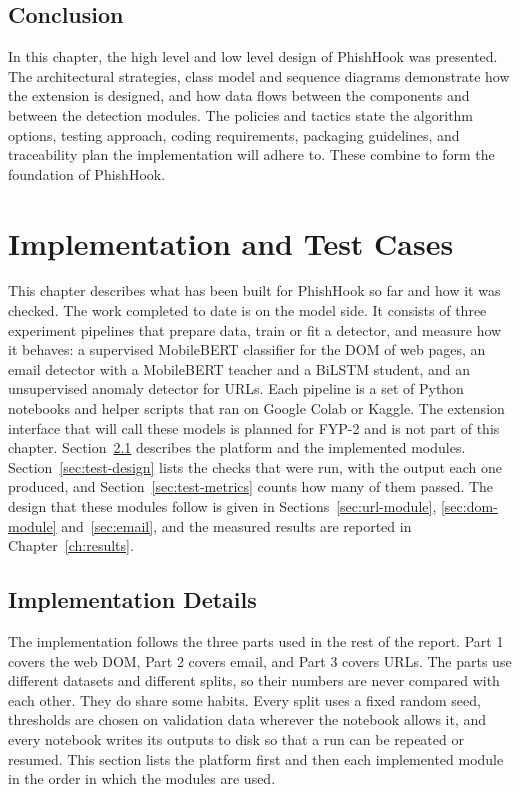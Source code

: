 \documentclass{FastFyp}
\begin{document}
\section{Conclusion}
\label{sec:design-conclusion}
In this chapter, the high level and low level design of PhishHook was presented. The architectural strategies, class model and sequence diagrams demonstrate how the extension is designed, and how data flows between the components and between the detection modules. The policies and tactics state the algorithm options, testing approach, coding requirements, packaging guidelines, and traceability plan the implementation will adhere to. These combine to form the foundation of PhishHook.










\chapter{Implementation and Test Cases}
\label{ch:implementation}
This chapter describes what has been built for PhishHook so far and how it was checked. The work completed to date is on the model side. It consists of three experiment pipelines that prepare data, train or fit a detector, and measure how it behaves: a supervised MobileBERT classifier for the DOM of web pages, an email detector with a MobileBERT teacher and a BiLSTM student, and an unsupervised anomaly detector for URLs. Each pipeline is a set of Python notebooks and helper scripts that ran on Google Colab or Kaggle. The extension interface that will call these models is planned for FYP-2 and is not part of this chapter. 
Section~\ref{sec:impl-details} describes the platform and the implemented modules. Section~\ref{sec:test-design} lists the checks that were run, with the output each one produced, and Section~\ref{sec:test-metrics} counts how many of them passed. The design that these modules follow is given in Sections~\ref{sec:url-module}, \ref{sec:dom-module} and~\ref{sec:email}, and the measured results are reported in Chapter~\ref{ch:results}. 

\section{Implementation Details}
\label{sec:impl-details}
The implementation follows the three parts used in the rest of the report. Part 1 covers the web DOM, Part 2 covers email, and Part 3 covers URLs. The parts use different datasets and different splits, so their numbers are never compared with each other. They do share some habits. Every split uses a fixed random seed, thresholds are chosen on validation data wherever the notebook allows it, and every notebook writes its outputs to disk so that a run can be repeated or resumed. This section lists the platform first and then each implemented module in the order in which the modules are used.
\end{document}
